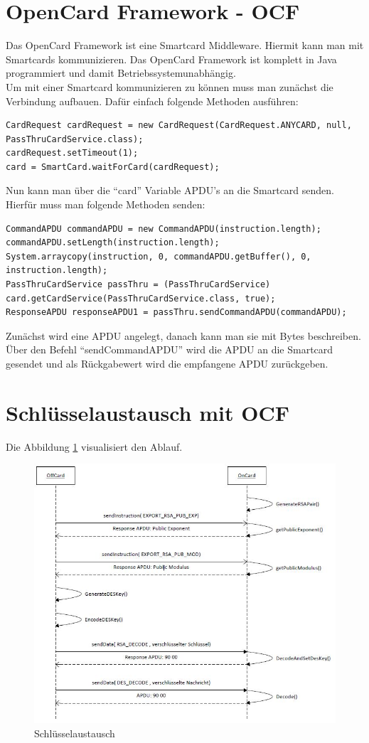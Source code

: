 \documentclass[parskip]{scrartcl}
\begin{document}
\section{OpenCard Framework - OCF}
Das OpenCard Framework ist eine Smartcard Middleware. Hiermit kann man mit Smartcards kommunizieren. Das OpenCard Framework ist komplett in Java programmiert und damit Betriebssystemunabhängig.\\
Um mit einer Smartcard kommunizieren zu können muss man zunächst die Verbindung aufbauen. Dafür einfach folgende Methoden ausführen:
\begin{lstlisting}
CardRequest cardRequest = new CardRequest(CardRequest.ANYCARD, null, PassThruCardService.class);
cardRequest.setTimeout(1);
card = SmartCard.waitForCard(cardRequest);
\end{lstlisting}
Nun kann man über die \enquote{card} Variable APDU's an die Smartcard senden. Hierfür muss man folgende Methoden senden:
\begin{lstlisting}
CommandAPDU commandAPDU = new CommandAPDU(instruction.length);
commandAPDU.setLength(instruction.length);
System.arraycopy(instruction, 0, commandAPDU.getBuffer(), 0, instruction.length);
PassThruCardService passThru = (PassThruCardService) card.getCardService(PassThruCardService.class, true);
ResponseAPDU responseAPDU1 = passThru.sendCommandAPDU(commandAPDU);
\end{lstlisting}
Zunächst wird eine APDU angelegt, danach kann man sie mit Bytes beschreiben. Über den Befehl \enquote{sendCommandAPDU} wird die APDU an die Smartcard gesendet und als Rückgabewert wird die empfangene APDU zurückgeben.\\
\section{Schlüsselaustausch mit OCF}
Die Abbildung \ref{fig:KeyExchange} visualisiert den Ablauf.

\begin{figure}[h]
\includegraphics[width=1.2\linewidth]{./KeyExchange}
\caption{Schlüsselaustausch}
\label{fig:KeyExchange}
\end{figure}
\end{document}
